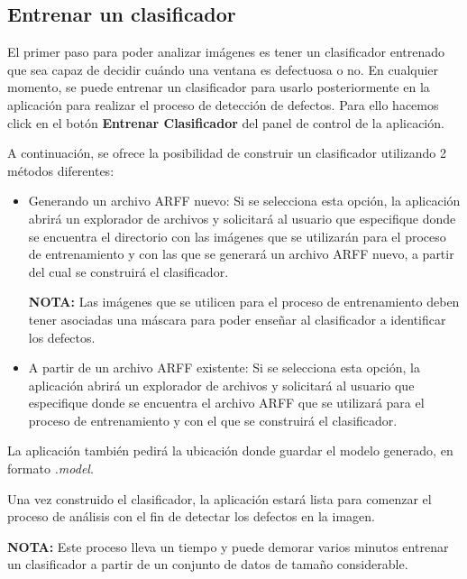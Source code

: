 \subsection{Entrenar un clasificador}
El primer paso para poder analizar imágenes es tener un clasificador entrenado que sea capaz de decidir cuándo una ventana es defectuosa o no. En cualquier momento, se puede entrenar un clasificador para usarlo posteriormente en la aplicación para realizar el proceso de detección de defectos. Para ello hacemos click en el botón \textbf{Entrenar Clasificador} del panel de control de la aplicación.


A continuación, se ofrece la posibilidad de construir un clasificador utilizando 2 métodos diferentes:


\begin{itemize}
\item Generando un archivo ARFF nuevo: Si se selecciona esta opción, la aplicación abrirá un explorador de archivos y solicitará al usuario que especifique donde se encuentra el directorio con las imágenes que se utilizarán para el proceso de entrenamiento y con las que se generará un archivo ARFF nuevo, a partir del cual se construirá el clasificador.

\textbf{NOTA:} Las imágenes que se utilicen para el proceso de entrenamiento deben tener asociadas una máscara para poder enseñar al clasificador a identificar los defectos.

\item A partir de un archivo ARFF existente: Si se selecciona esta opción, la aplicación abrirá un explorador de archivos y solicitará al usuario que especifique donde se encuentra el archivo ARFF que se utilizará para el proceso de entrenamiento y con el que se construirá el clasificador.
\end{itemize}

La aplicación también pedirá la ubicación donde guardar el modelo generado, en formato \textit{.model}.

Una vez construido el clasificador, la aplicación estará lista para comenzar el proceso de análisis con el fin de detectar los defectos en la imagen.

\textbf{NOTA:} Este proceso lleva un tiempo y puede demorar varios minutos entrenar un clasificador a partir de un conjunto de datos de tamaño considerable.

